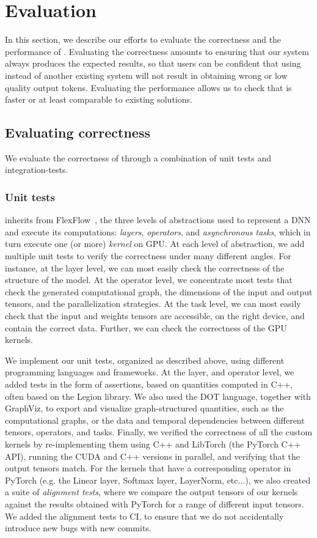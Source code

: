 
\chapter{Evaluation}\label{chapter-7}
In this section, we describe our efforts to evaluate the correctness and the performance of \Project. Evaluating the correctness amounts to ensuring that our system always produces the expected results, so that users can be confident that using \Project instead of another existing system will not result in obtaining wrong or low quality output tokens. Evaluating the performance allows us to check that \Project is faster or at least comparable to existing solutions.

\section{Evaluating correctness}
We evaluate the correctness of \Project through a combination of unit tests and integration-tests.

\subsection{Unit tests}
\Project inherits from FlexFlow~\cite{flexflow,unity}, the three levels of abstractions used to represent a DNN and execute its computations: \textit{layers}, \textit{operators}, and \textit{asynchronous tasks}, which in turn execute one (or more) \textit{kernel} on GPU. At each level of abstraction, we add multiple unit tests to verify the correctness under many different angles. For instance, at the layer level, we can most easily check the correctness of the structure of the model. At the operator level, we concentrate most tests that check the generated computational graph, the dimensions of the input and output tensors, and the parallelization strategies. At the task level, we can most easily check that the input and weights tensors are accessible, on the right device, and contain the correct data. Further, we can check the correctness of the GPU kernels. 

We implement our unit tests, organized as described above, using different programming languages and frameworks. At the layer, and operator level, we added tests in the form of assertions, based on quantities computed in C++, often based on the Legion library. We also used the DOT language, together with GraphViz, to export and visualize graph-structured quantities, such as the computational graphs, or the data and temporal dependencies between different tensors, operators, and tasks. Finally, we verified the correctness of all the custom kernels by re-implementing them using C++ and LibTorch (the PyTorch C++ API), running the CUDA and C++ versions in parallel, and verifying that the output tensors match. For the kernels that have a corresponding operator in PyTorch (e.g. the Linear layer, Softmax layer, LayerNorm, etc...), we also created a suite of \textit{alignment tests}, where we compare the output tensors of our kernels against the results obtained with PyTorch for a range of different input tensors. We added the alignment tests to CI, to ensure that we do not accidentally introduce new bugs with new commits.

